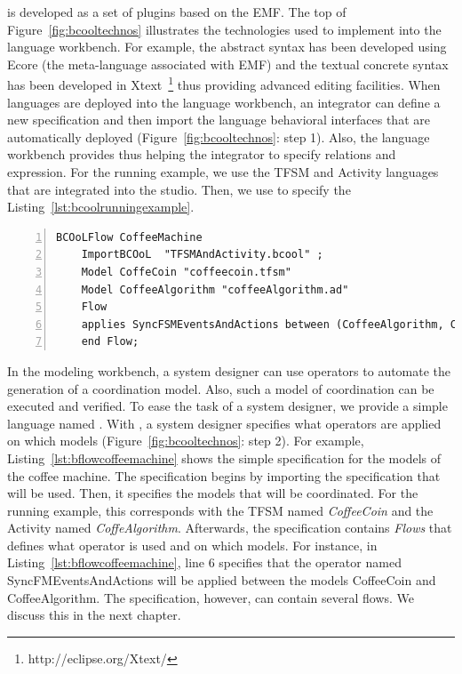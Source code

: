 \bcool is developed as a set of plugins based on the EMF. The top of Figure~\ref{fig:bcooltechnos} illustrates the technologies used to implement \bcool into the language workbench. For example, the \bcool abstract syntax has been developed using Ecore (\ie the meta-language associated with EMF) and the textual concrete syntax has been developed in Xtext~\footnote{http://eclipse.org/Xtext/} thus providing advanced editing facilities. When languages are deployed into the language workbench, an integrator can define a new \bcool specification and then import the language behavioral interfaces that are automatically deployed (Figure~\ref{fig:bcooltechnos}: step 1). Also, the language workbench provides \moccml thus helping the integrator to specify relations and expression. For the running example, we use the TFSM and Activity languages that are integrated into the studio. Then, we use \bcool to specify the Listing~\ref{lst:bcoolrunningexample}.   
	\begin{lstlisting}[language=bflow,
	caption={\bflow specification for the models of the coffee machine},
	label={lst:bflowcoffeemachine}, 
	basicstyle=\scriptsize\ttfamily, backgroundcolor=\color{LGrey}, numbers=left, xleftmargin=2pt]
	BCOoLFlow CoffeeMachine
	ImportBCOoL  "TFSMAndActivity.bcool" ;
	Model CoffeCoin "coffeecoin.tfsm"
	Model CoffeeAlgorithm "coffeeAlgorithm.ad"
	Flow 
	applies SyncFSMEventsAndActions between (CoffeeAlgorithm, CoffeCoin);
	end Flow;
	\end{lstlisting}


In the modeling workbench, a system designer can use \bcool operators to automate the generation of a coordination model. Also, such a model of coordination can be executed and verified. To ease the task of a system designer, we provide a simple language named \bflow. With \bflow, a system designer specifies what operators are applied on which models (Figure~\ref{fig:bcooltechnos}: step 2). For example, Listing~\ref{lst:bflowcoffeemachine} shows the simple \bflow specification for the models of the coffee machine. The \bflow specification begins by importing the \bcool specification that will be used. Then, it specifies the models that will be coordinated. For the running example, this corresponds with the TFSM named \emph{CoffeeCoin} and the Activity named \emph{CoffeAlgorithm}. Afterwards, the specification contains \emph{Flows} that defines what operator is used and on which models. For instance, in Listing~\ref{lst:bflowcoffeemachine}, line 6 specifies that the operator named SyncFMEventsAndActions will be applied between the models CoffeeCoin and CoffeeAlgorithm. The specification, however, can contain several flows. We discuss this in the next chapter.   

